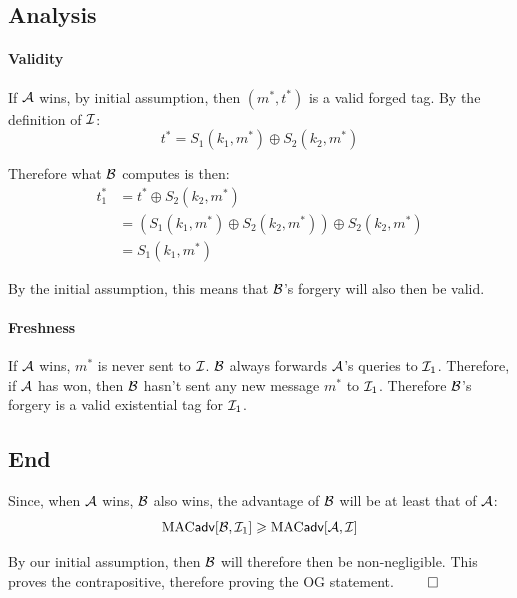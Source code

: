 \documentclass[12pt]{article}
\newif\ifsol
\begin{document}
\begin{solution}
\subsection*{Analysis}
\paragraph{Validity} If $\mathcal{A}$ wins, by initial assumption, then $(m^*, t^*)$ is a valid forged tag. By the definition of $\mathcal{I}$:
\begin{equation*}
    t^* = S_1(k_1, m^*) \oplus S_2(k_2, m^*)
\end{equation*}

\noindent Therefore what $\mathcal{B}$ computes is then:
\begin{equation*}
    \begin{aligned}
        t^*_1 &= t^* \oplus S_2(k_2, m^*)\\
        &= (S_1(k_1, m^*) \oplus S_2(k_2, m^*)) \oplus S_2(k_2, m^*)\\
        &= S_1(k_1, m^*)
    \end{aligned}
\end{equation*}

\noindent By the initial assumption, this means that $\mathcal{B}$'s forgery will also then be valid.

\paragraph{Freshness} If $\mathcal{A}$ wins, $m^*$ is never sent to $\mathcal{I}$. $\mathcal{B}$ always forwards $\mathcal{A}$'s queries to $\mathcal{I}_1$. Therefore, if $\mathcal{A}$ has won, then $\mathcal{B}$ hasn't
sent any new message $m^*$ to $\mathcal{I}_1$. Therefore $\mathcal{B}$'s forgery is a valid existential tag for $\mathcal{I}_1$.

\subsection*{End}
Since, when $\mathcal{A}$ wins, $\mathcal{B}$ also wins, the advantage of $\mathcal{B}$ will be at least that of $\mathcal{A}$:
\begin{equation*}
    \textrm{MAC}\textsf{adv}[\mathcal{B}, \mathcal{I}_1] \geqslant \textrm{MAC}\textsf{adv}[\mathcal{A}, \mathcal{I}] 
\end{equation*}

\noindent By our initial assumption, then $\mathcal{B}$ will therefore then be non-negligible. This proves the contrapositive, therefore proving the OG statement. $\qed$

\end{solution}

\ifsol\else\newpage\fi
\end{document}
